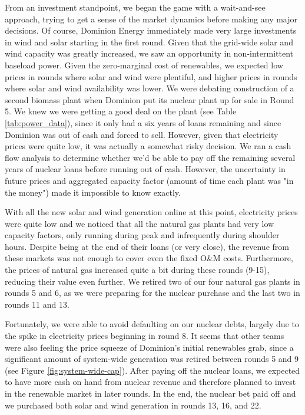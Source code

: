 \documentclass[journal,11pt]{IEEEtran}
\begin{document}
From an investment standpoint, we began the game with a wait-and-see approach, trying to get a sense of the market dynamics before making any major
decisions.  Of course, Dominion Energy immediately made very large investments in wind and solar starting in the first round. Given that the grid-wide solar
and wind capacity was greatly increased, we saw an opportunity in non-intermittent baseload power. Given the zero-marginal cost of renewables, we expected
low prices in rounds where solar and wind were plentiful, and higher prices in rounds where solar and wind availability was lower. We were debating
construction of a second biomass plant when Dominion put its nuclear plant up for sale in Round 5. We knew we were getting a good deal on the plant (see Table \ref{tab:power_data}), since
it only had a six years of loans remaining and since Dominion was out of cash and forced to sell. However, given that electricity prices were quite low, it was
actually a somewhat risky decision. We ran a cash flow analysis to determine whether we'd be able to pay off the remaining several years of nuclear loans before
running out of cash. However, the uncertainty in future prices and aggregated capacity factor (amount of time each plant was "in the money") made it impossible
to know exactly.

With all the new solar and wind generation online at this point, electricity prices were quite low and we noticed that all the natural gas plants had
very low capacity factors, only running during peak and infrequently during shoulder hours. Despite being at the end of their loans (or very close),
the revenue from these markets was not enough to cover even the fixed O\&M costs. Furthermore, the prices of natural gas increased quite a bit during
these rounds (9-15), reducing their value even further. We retired two of our four natural gas plants in rounds 5 and 6, as we were preparing for
the nuclear purchase and the last two in rounds 11 and 13.

Fortunately, we were able to avoid defaulting on our nuclear debts, largely due to the spike in electricity prices beginning in round 8. It seems that other
teams were also feeling the price squeeze of Dominion's initial renewables grab, since a significant amount of system-wide generation was retired between rounds 5 and 9
(see Figure \ref{fig:system-wide-cap}).
After paying off the nuclear loans, we expected to have more cash on hand from nuclear revenue and therefore planned to invest in the renewable market
in later rounds. In the end, the nuclear bet paid off and we purchased both solar and wind generation in rounds 13, 16, and 22.
\end{document}
